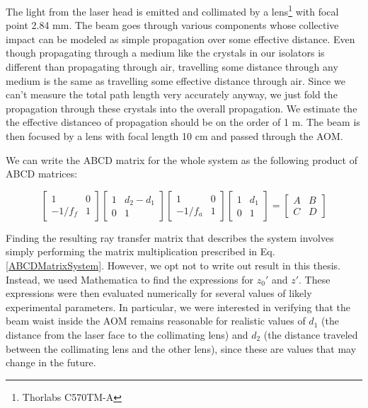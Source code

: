 The light from the laser head is emitted and collimated by a lens\footnote{Thorlabs C570TM-A} with focal point 2.84 mm.%
The beam goes through various components whose collective impact can be modeled as simple propagation over some effective distance. Even though propagating through a medium like the crystals in our isolators is different than propagating through air, travelling some distance through any medium is the same as travelling some effective distance through air. Since we can't measure the total path length very accurately anyway, we just fold the propagation through these crystals into the overall propagation.
We estimate the the effective distanceo of propagation should be on the order of 1 m. The beam is then focused by a lens with focal length 10 cm and passed through the AOM. 

We can write the ABCD matrix for the whole system as the following product of ABCD matrices: 

\begin{equation}\label{ABCDMatrixSystem}
\begin{bmatrix}
1 & 0 \\ -1/f_{f} & 1
\end{bmatrix}
\begin{bmatrix}
1 & d_2-d_1 \\ 0 & 1
\end{bmatrix}
\begin{bmatrix}
1 & 0 \\ -1/f_{a} & 1
\end{bmatrix}
\begin{bmatrix}
1 & d_1 \\ 0 & 1
\end{bmatrix}
=
\begin{bmatrix}
A & B \\ C & D
\end{bmatrix}
\end{equation}

Finding the resulting ray transfer matrix that describes the system involves simply performing the matrix multiplication prescribed in Eq.\,\ref{ABCDMatrixSystem}. However, we opt not to write out result in this thesis. Instead, we used Mathematica to find the expressions for $z_0'$ and $z'$. These expressions were then evaluated numerically for several values of likely experimental parameters. In particular, we were interested in verifying that the beam waist inside the AOM remains reasonable for realistic values of $d_1$ (the distance from the laser face to the collimating lens) and $d_2$ (the distance traveled between the collimating lens and the other lens), since these are values that may change in the future.


